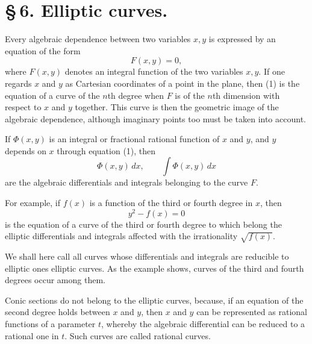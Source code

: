 \documentclass[11pt]{article}
\begin{document}
\section*{\S\,6. Elliptic curves.}

Every algebraic dependence between two variables $x,y$ is expressed by an equation of the form
\begin{equation}
F(x,y)=0,
\tag{1}
\end{equation}
where $F(x,y)$ denotes an integral function of the two variables $x,y$. If one regards $x$ and $y$ as Cartesian coordinates of a point in the plane, then (1) is the equation of a curve of the $n$th degree when $F$ is of the $n$th dimension with respect to $x$ and $y$ together. This curve is then the geometric image of the algebraic dependence, although imaginary points too must be taken into account.

If $\Phi(x,y)$ is an integral or fractional rational function of $x$ and $y$, and $y$ depends on $x$ through equation (1), then
\begin{equation}
\Phi(x,y)\,dx,\qquad \int\Phi(x,y)\,dx
\tag{2}
\end{equation}
are the algebraic differentials and integrals belonging to the curve $F$.

For example, if $f(x)$ is a function of the third or fourth degree in $x$, then
\[
y^2-f(x)=0
\]
is the equation of a curve of the third or fourth degree to which belong the elliptic differentials and integrals affected with the irrationality $\sqrt{f(x)}$.

We shall here call all curves whose differentials and integrals are reducible to elliptic ones elliptic curves. As the example shows, curves of the third and fourth degrees occur among them.

Conic sections do not belong to the elliptic curves, because, if an equation of the second degree holds between $x$ and $y$, then $x$ and $y$ can be represented as rational functions of a parameter $t$, whereby the algebraic differential can be reduced to a rational one in $t$. Such curves are called rational curves.
\end{document}
